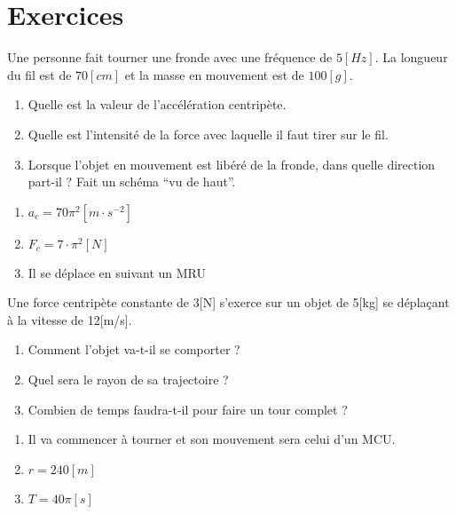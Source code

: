 \section{Exercices}
\begin{exercise}
    Une personne fait tourner une fronde avec une fréquence de \(5[Hz]\). La longueur du fil est de \(70[cm]\) et la masse en mouvement est de \(100[g]\).
    \begin{enumerate}[label=\alph*]
        \item Quelle est la valeur de l'accélération centripète.
        \item Quelle est l'intensité de la force avec laquelle il faut tirer sur le fil.
        \item Lorsque l'objet en mouvement est libéré de la fronde, dans quelle direction part-il ? Fait un schéma \enquote{vu de haut}.
    \end{enumerate}
\end{exercise}
\begin{solution}
    \begin{enumerate}[label=\alph*]
        \item \(a_c=70 \pi^2[m \cdot s^{-2}]\)
        \item \(F_c=7 \cdot \pi^2[N] \)
        \item Il se déplace en suivant un MRU
    \end{enumerate}
\end{solution}

\begin{exercise}
    Une force centripète constante de 3[N] s'exerce sur un objet de 5[kg] se déplaçant à la vitesse de 12[m/s].
    \begin{enumerate}[label=\alph*]
        \item Comment l'objet va-t-il se comporter ?
        \item Quel sera le rayon de sa trajectoire ?
        \item Combien de temps faudra-t-il pour faire un tour complet ?
    \end{enumerate}
\end{exercise}
\begin{solution}
    \begin{enumerate}[label=\alph*]
        \item Il va commencer à tourner et son mouvement sera celui d'un MCU.
        \item \(r=240[m] \)
        \item \(T=40 \pi[s]\)
    \end{enumerate}
\end{solution}


